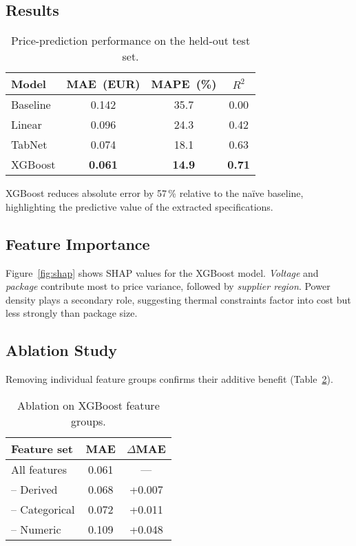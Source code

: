 \subsection{Results}
\begin{table}[H]
\centering
\caption{Price-prediction performance on the held-out test set.}
\label{tab:cost}
\begin{tabular}{lccc}
\toprule
Model & MAE~(EUR) & MAPE~(\%) & $R^{2}$ \\
\midrule
Baseline  & 0.142 & 35.7 & 0.00 \\
Linear    & 0.096 & 24.3 & 0.42 \\
TabNet    & 0.074 & 18.1 & 0.63 \\
XGBoost   & \textbf{0.061} & \textbf{14.9} & \textbf{0.71} \\
\bottomrule
\end{tabular}
\end{table}
XGBoost reduces absolute error by 57\,\% relative to the naïve baseline, highlighting the predictive value of the extracted specifications.

\subsection{Feature Importance}
Figure~\ref{fig:shap} shows SHAP values for the XGBoost model.  \textit{Voltage} and \textit{package} contribute most to price variance, followed by \textit{supplier region}.  Power density plays a secondary role, suggesting thermal constraints factor into cost but less strongly than package size.

\subsection{Ablation Study}
Removing individual feature groups confirms their additive benefit (Table~\ref{tab:ablation-cost}).

\begin{table}[H]
\centering
\caption{Ablation on XGBoost feature groups.}
\label{tab:ablation-cost}
\begin{tabular}{lcc}
\toprule
Feature set & MAE & $\Delta$MAE \\
\midrule
All features & 0.061 & --- \\
-- Derived    & 0.068 & +0.007 \\
-- Categorical & 0.072 & +0.011 \\
-- Numeric     & 0.109 & +0.048 \\
\bottomrule
\end{tabular}
\end{table}

